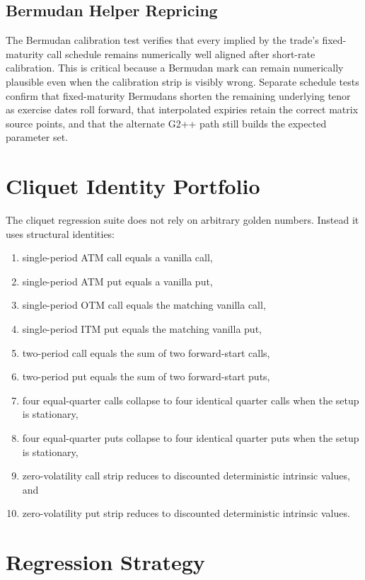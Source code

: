 \documentclass[11pt]{article}
\begin{document}
\subsection{Bermudan Helper Repricing}
The Bermudan calibration test verifies that every  implied by the trade's fixed-maturity call schedule remains numerically well aligned after short-rate calibration. This is critical because a Bermudan mark can remain numerically plausible even when the calibration strip is visibly wrong. Separate schedule tests confirm that fixed-maturity Bermudans shorten the remaining underlying tenor as exercise dates roll forward, that interpolated expiries retain the correct matrix source points, and that the alternate G2++ path still builds the expected parameter set.

\section{Cliquet Identity Portfolio}
The cliquet regression suite does not rely on arbitrary golden numbers. Instead it uses structural identities:
\begin{enumerate}[leftmargin=1.5em]
    \item single-period ATM call equals a vanilla call,
    \item single-period ATM put equals a vanilla put,
    \item single-period OTM call equals the matching vanilla call,
    \item single-period ITM put equals the matching vanilla put,
    \item two-period call equals the sum of two forward-start calls,
    \item two-period put equals the sum of two forward-start puts,
    \item four equal-quarter calls collapse to four identical quarter calls when the setup is stationary,
    \item four equal-quarter puts collapse to four identical quarter puts when the setup is stationary,
    \item zero-volatility call strip reduces to discounted deterministic intrinsic values, and
    \item zero-volatility put strip reduces to discounted deterministic intrinsic values.
\end{enumerate}

\section{Regression Strategy}
\end{document}
